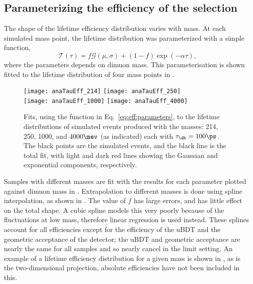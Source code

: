 \subsection{Parameterizing the efficiency of the \db selection}
The shape of the lifetime efficiency distribution varies with mass.
At each simulated mass point, the lifetime distribution was parameterized with a simple function,
\begin{equation}
  \mathcal{T}(\tau) = f\mathcal{G}(\mu, \sigma) + (1-f)\exp\left(-\alpha\tau\right),
  \label{eq:eff:parameters}
\end{equation}
where the parameters depends on dimuon mass.
This parameterisation is shown fitted to the lifetime distribution of four mass points in
.


\begin{figure}
  \begin{center}
    \texttt{[image: anaTauEff\_214]}
    \texttt{[image: anaTauEff\_250]}\\
    \texttt{[image: anaTauEff\_1000]}
    \texttt{[image: anaTauEff\_4000]}
    \caption{\small
      Fits, using the function in Eq.~\protect\ref{eq:eff:parameters},
      to the lifetime distributions of simulated events produced with the masses:
      214, 250, 1000, and $4000\mev$ (as indicated)
      each with $\tau_\db=100\ps$.
      The black points are the simulated events, and the black line is the total fit, with light
      and dark red lines showing the Gaussian and exponential components, respectively.
    }
    \label{fig:eff:fits}
  \end{center}
\end{figure}


Samples with different masses are fit with the results for each parameter plotted against dimuon
mass in .
Extrapolation to different masses is done using spline interpolation, as shown in
.
The value of $f$ has large errors, and has little effect on the total shape.
A cubic spline models this very poorly because of the fluctuations at low mass, therefore linear
regression is used instead.
These splines account for all efficiencies except for the efficiency of the uBDT and the geometric
acceptance of the \lhcb detector; the uBDT and geometric acceptance are nearly the same for all
samples and so nearly cancel in the limit setting.
An example of a lifetime efficiency distribution for a given mass is shown in ,
as is the two-dimensional projection, absolute efficiencies have not been included in this.

